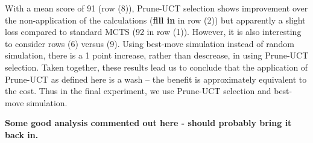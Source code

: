 \documentclass[letterpaper]{article}
\begin{document}
With a mean score of 91 (row (8)), Prune-UCT selection shows improvement over the non-application of the calculations ({\bf fill in} in row (2)) but apparently a slight loss compared to standard MCTS (92 in row (1)). However, it is also interesting to consider rows (6) versus (9). Using best-move simulation instead of random simulation, there is a 1 point increase, rather than descrease, in using Prune-UCT selection. Taken together, these results lead us to conclude that the application of Prune-UCT as defined here is a wash -- the benefit is approximately equivalent to the cost. Thus in the final experiment, we use Prune-UCT selection and best-move simulation.

{\bf Some good analysis commented out here - should probably bring it back in.}


\end{document}
